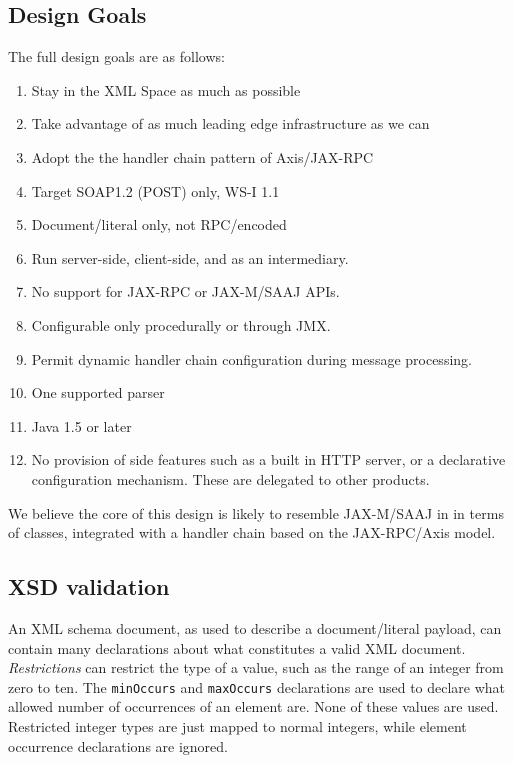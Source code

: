 \subsection{Design Goals}
\label{alpine:design}

The full design goals are as follows:

\begin{enumerate}

\item Stay in the XML Space as much as possible
\item Take advantage of as much leading edge infrastructure as we can
\item Adopt the the handler chain pattern of Axis/JAX-RPC
\item Target SOAP1.2 (POST) only, WS-I 1.1
\item Document/literal only, not RPC/encoded
\item Run server-side, client-side, and as an intermediary. 
\item No support for JAX-RPC or JAX-M/SAAJ APIs.
\item Configurable only procedurally or through JMX.
\item Permit dynamic handler chain configuration during message processing.
\item One supported parser %
\item Java 1.5 or later 

\item No provision of side features such as a built in HTTP server, or
a declarative configuration mechanism. These are delegated to other products.
\end{enumerate}

We believe the core of this design is likely to resemble JAX-M/SAAJ in
in terms of classes, integrated with a handler chain based on the
JAX-RPC/Axis model.

\subsection{XSD validation}
\label{alpine:validation}
An XML schema document, as used to describe a document/literal
payload, can contain many declarations about what constitutes a valid
XML document. \emph{Restrictions} can restrict the type of a value,
such as the range of an integer from zero to ten. The \verb|minOccurs|
and \verb|maxOccurs| declarations are used to declare what allowed
number of occurrences of an element are. None of these values are
used. Restricted integer types are just mapped to normal integers,
while element occurrence declarations are ignored.

